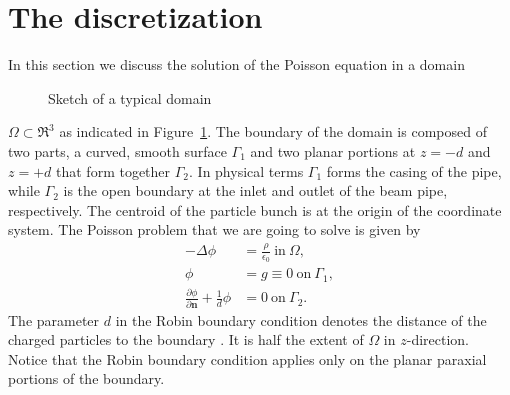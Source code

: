 \section{The discretization}
\label{sec:discr}

In this section we discuss the solution of the Poisson equation in a
domain 
\begin{figure}[htb]
  \centering
  
  \caption{Sketch of a typical domain}
  \label{fig:domain}
\end{figure}
$\Omega \subset \Re^3$ as indicated in Figure~\ref{fig:domain}.  The
boundary of the domain is composed of two parts, a curved, smooth
surface $\Gamma_1$ and two planar portions at $z=-d$ and $z=+d$ that
form together $\Gamma_2$.  In physical terms $\Gamma_1$ forms the casing
of the pipe, while $\Gamma_2$ is the open boundary at the inlet and
outlet of the beam pipe, respectively.  The centroid of the particle bunch is at the
origin of the coordinate system.  The Poisson problem that we are going
to solve is given by
\begin{equation} \label{eq:poisson}
  \begin{aligned}
    -\Delta \phi &= \frac{\rho}{\epsilon_0}\ \text{in}\ \Omega, \\
    \phi &= g \equiv 0\ \text{on}\ \Gamma_1,   \\
    \frac{\partial \phi}{\partial \mathbf{n}} + \frac {1}{d} \phi &= 0\
    \text{on}\ \Gamma_2.
  \end{aligned}
\end{equation}
The parameter $d$ in the Robin boundary condition denotes the distance
of the charged particles to the boundary
\cite{poplau_self-adaptive_2008}.  It is half the extent of $\Omega$ in
$z$-direction.  Notice that the Robin boundary condition applies only on
the planar paraxial portions of the boundary.

